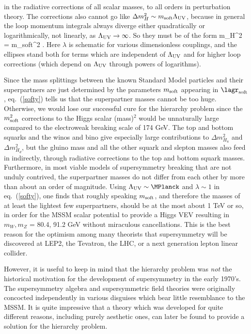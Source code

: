 in the radiative corrections of all scalar masses, to all orders
in perturbation theory.
The corrections also cannot go like $\Delta m_H^2 \sim m_{\rm soft}
\Lambda_{\rm UV}$, because in general the loop momentum integrals
always diverge either quadratically or logarithmically, not linearly,
as $\Lambda_{\rm UV} \rightarrow \infty$. So
they must be of the form
\beq
\Delta m_{H}^2 =
m_{\rm soft}^2
.
\label{softy}
\eeq
Here $\lambda$ is schematic for various 
dimensionless couplings,
and the ellipses stand both for
terms which are independent of $\Lambda_{\rm UV}$ and for
higher loop corrections (which
depend on $\Lambda_{\rm UV}$ through powers of logarithms).

Since the mass splittings between the known Standard Model particles
and their
superpartners
are just determined by the parameters $m_{\rm soft}$ appearing
in $\lagr_{\rm soft}$, eq.~(\ref{softy})
tells us that the superpartner masses cannot be too huge.
Otherwise, we would lose our successful cure for the hierarchy
problem since the $m_{\rm soft}^2$ corrections to the Higgs
scalar (mass)$^2$ would be
unnaturally large compared to the electroweak breaking scale of 174 GeV.
The top and bottom squarks and the winos and bino give especially
large contributions to $\Delta m_{H_u}^2$ and $\Delta m_{H_d}^2$,
but the gluino mass and all the other squark and slepton masses also feed
in indirectly, through radiative corrections
to the top and bottom squark masses.
Furthermore, in most viable models of supersymmetry breaking that
are not unduly contrived, the superpartner masses do not
differ from each other by more than about an order of magnitude.
Using $\Lambda_{\rm UV} \sim \MPlanck$ and $\lambda \sim 1$ in
eq.~(\ref{softy}),
one finds that roughly speaking $m_{\rm soft}$, and therefore
the masses of at least the lightest few
superpartners, should be at the most about 1 TeV or so,
in order for the MSSM scalar potential to provide a Higgs
VEV resulting in $m_W,m_Z$ = 80.4, 91.2 GeV
without miraculous cancellations.
This is the best reason for the optimism
among many theorists that supersymmetry will be discovered at
LEP2, the Tevatron, the
LHC, or a next generation lepton linear
collider.

However, it is useful to keep in mind that
the hierarchy problem was {\it not} the historical motivation for
the development of supersymmetry in the early 1970's. The supersymmetry
algebra and supersymmetric field theories were originally concocted
independently in various disguises
\cite{RNS,Golfand,WessZumino,Volkov}
which bear little resemblance to the MSSM. It is quite impressive that
a theory which was developed for quite different reasons, including
purely aesthetic ones, can later be found to
provide a solution for the hierarchy problem.

